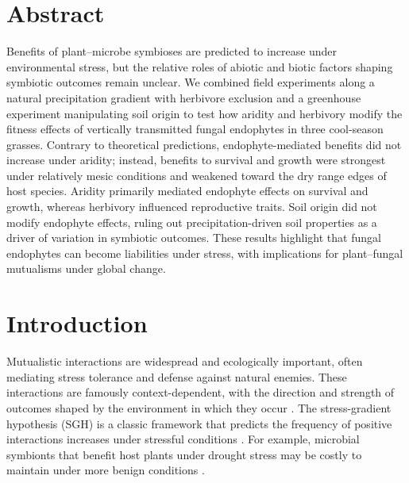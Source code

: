 \documentclass[12pt]{article}\usepackage[]{graphicx}\usepackage[dvipsnames]{xcolor}
\begin{document}
\section*{Abstract}
Benefits of plant--microbe symbioses are predicted to increase under environmental stress, but the relative roles of abiotic and biotic factors shaping symbiotic outcomes remain unclear.
We combined field experiments along a natural precipitation gradient with herbivore exclusion and a greenhouse experiment manipulating soil origin to test how aridity and herbivory modify the fitness effects of vertically transmitted fungal endophytes in three cool-season grasses.
Contrary to theoretical predictions, endophyte-mediated benefits did not increase under aridity; instead, benefits to survival and growth were strongest under relatively mesic conditions and weakened toward the dry range edges of host species.
Aridity primarily mediated endophyte effects on survival and growth, whereas herbivory influenced reproductive traits.
Soil origin did not modify endophyte effects, ruling out precipitation-driven soil properties as a driver of variation in symbiotic outcomes.
These results highlight that fungal endophytes can become liabilities under stress, with implications for plant--fungal mutualisms under global change.
\newpage
\section*{Introduction}
Mutualistic interactions are widespread and ecologically important, often mediating stress tolerance and defense against natural enemies. 
These interactions are famously context-dependent, with the direction and strength of outcomes shaped by the environment in which they occur \citep{hoeksema2015context, bronstein1994conditional,hoang2024impacts}. 
The stress-gradient hypothesis (SGH) is a classic  framework that predicts the frequency of positive interactions increases under stressful conditions \citep{louthan2015and,bertness1994positive,holmgren2010strong,maestre2009refining}.
For example, microbial symbionts that benefit host plants under drought stress may be costly to maintain under more benign conditions \citep{giauque2019endophyte}. 
\end{document}
